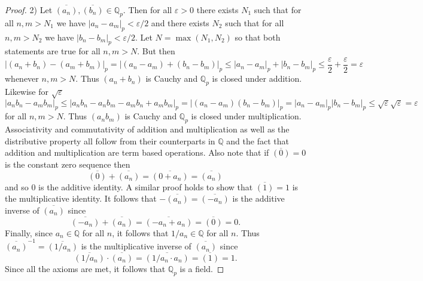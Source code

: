 \documentclass{article}
\begin{document}
\begin{flushleft}
\begin{proof}
2) Let $\overline{(a_n)}, \overline{(b_n)} \in \mathbb{Q}_p$. Then for all $\varepsilon > 0$ there exists $N_1$ such that for all $n, m > N_1$ we have $|a_n - a_m|_p < \varepsilon/2$ and there exists $N_2$ such that for all $n, m > N_2$ we have $|b_n - b_m|_p < \varepsilon/2$. Let $N = \max (N_1, N_2)$ so that both statements are true for all $n, m > N$. But then
\[
|(a_n + b_n) - (a_m + b_m)|_p = |(a_n - a_m) + (b_n - b_m)|_p \leq |a_n - a_m|_p + |b_n - b_m|_p \leq \frac{\varepsilon}{2} + \frac{\varepsilon}{2} = \varepsilon
\]
whenever $n, m > N$. Thus $(a_n + b_n)$ is Cauchy and $\mathbb{Q}_p$ is closed under addition. Likewise for $\sqrt{\varepsilon}$
\[
|a_n b_n - a_m b_m|_p \leq |a_n b_n - a_n b_m - a_m b_n + a_m b_m|_p = |(a_n - a_m)(b_n - b_m)|_p = |a_n - a_m|_p |b_n - b_m|_p \leq \sqrt{\varepsilon} \sqrt{\varepsilon} = \varepsilon
\]
for all $n, m > N$. Thus $(a_n b_m)$ is Cauchy and $\mathbb{Q}_p$ is closed under multiplication. Associativity and commutativity of addition and multiplication as well as the distributive property all follow from their counterparts in $\mathbb{Q}$ and the fact that addition and multiplication are term based operations. Also note that if $\overline{(0)} = 0$ is the constant zero sequence then
\[
\overline{(0)} + \overline{(a_n)} = \overline{(0 + a_n)} = \overline{(a_n)}
\]
and so $0$ is the additive identity. A similar proof holds to show that $\overline{(1)} = 1$ is the multiplicative identity. It follows that $-\overline{(a_n)} = \overline{(-a_n)}$ is the additive inverse of $\overline{(a_n)}$ since
\[
\overline{(-a_n)} + \overline{(a_n)} = \overline{(-a_n + a_n)} = \overline{(0)} = 0.
\]
Finally, since $a_n \in \mathbb{Q}$ for all $n$, it follows that $1/a_n \in \mathbb{Q}$ for all $n$. Thus $\overline{(a_n)}^{-1} = \overline{(1/a_n)}$ is the multiplicative inverse of $\overline{(a_n)}$ since
\[
\overline{(1/a_n)} \cdot \overline{(a_n)} = \overline{(1/a_n \cdot a_n)} = \overline{(1)} = 1.
\]
Since all the axioms are met, it follows that $\mathbb{Q}_p$ is a field.\newline


\end{proof}
\end{flushleft}
\end{document}
